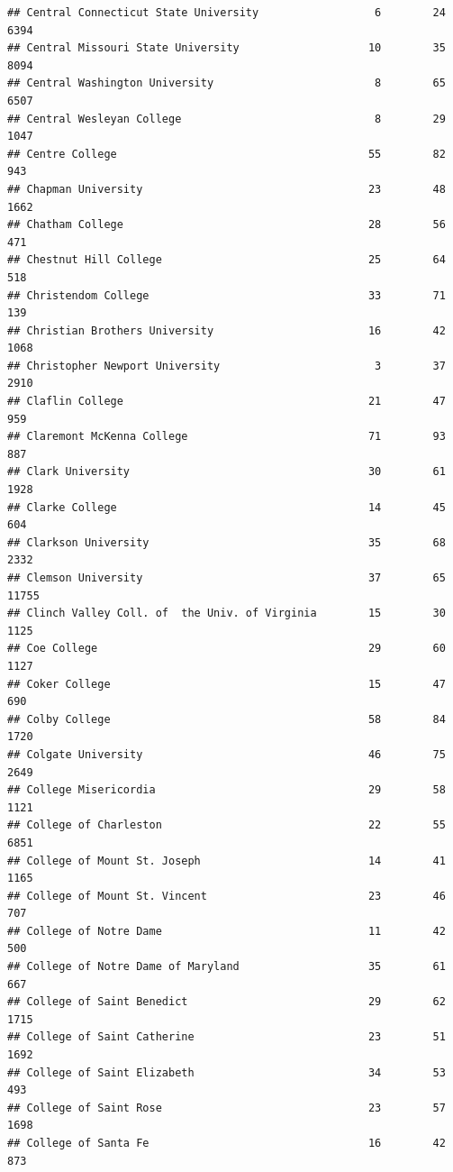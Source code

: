 \documentclass[
]{article}
\begin{document}
\begin{verbatim}
## Central Connecticut State University                  6        24        6394
## Central Missouri State University                    10        35        8094
## Central Washington University                         8        65        6507
## Central Wesleyan College                              8        29        1047
## Centre College                                       55        82         943
## Chapman University                                   23        48        1662
## Chatham College                                      28        56         471
## Chestnut Hill College                                25        64         518
## Christendom College                                  33        71         139
## Christian Brothers University                        16        42        1068
## Christopher Newport University                        3        37        2910
## Claflin College                                      21        47         959
## Claremont McKenna College                            71        93         887
## Clark University                                     30        61        1928
## Clarke College                                       14        45         604
## Clarkson University                                  35        68        2332
## Clemson University                                   37        65       11755
## Clinch Valley Coll. of  the Univ. of Virginia        15        30        1125
## Coe College                                          29        60        1127
## Coker College                                        15        47         690
## Colby College                                        58        84        1720
## Colgate University                                   46        75        2649
## College Misericordia                                 29        58        1121
## College of Charleston                                22        55        6851
## College of Mount St. Joseph                          14        41        1165
## College of Mount St. Vincent                         23        46         707
## College of Notre Dame                                11        42         500
## College of Notre Dame of Maryland                    35        61         667
## College of Saint Benedict                            29        62        1715
## College of Saint Catherine                           23        51        1692
## College of Saint Elizabeth                           34        53         493
## College of Saint Rose                                23        57        1698
## College of Santa Fe                                  16        42         873

\end{verbatim}
\end{document}
